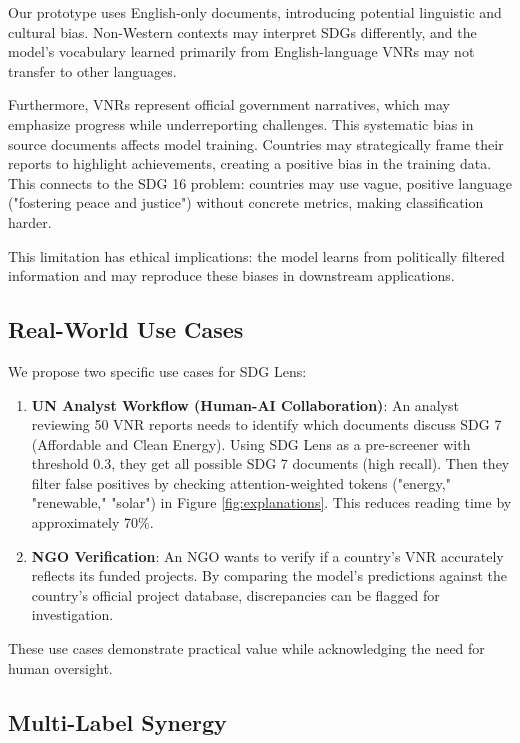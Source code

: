 \documentclass[12pt,a4paper]{article}
\begin{document}
Our prototype uses English-only documents, introducing potential linguistic and cultural bias. Non-Western contexts may interpret SDGs differently, and the model's vocabulary learned primarily from English-language VNRs may not transfer to other languages.

Furthermore, VNRs represent official government narratives, which may emphasize progress while underreporting challenges. This systematic bias in source documents affects model training. Countries may strategically frame their reports to highlight achievements, creating a positive bias in the training data. This connects to the SDG 16 problem: countries may use vague, positive language ("fostering peace and justice") without concrete metrics, making classification harder.

This limitation has ethical implications: the model learns from politically filtered information and may reproduce these biases in downstream applications.

\subsection{Real-World Use Cases}

We propose two specific use cases for SDG Lens:

\begin{enumerate}
    \item \textbf{UN Analyst Workflow (Human-AI Collaboration)}: An analyst reviewing 50 VNR reports needs to identify which documents discuss SDG 7 (Affordable and Clean Energy). Using SDG Lens as a pre-screener with threshold 0.3, they get all possible SDG 7 documents (high recall). Then they filter false positives by checking attention-weighted tokens ("energy," "renewable," "solar") in Figure \ref{fig:explanations}. This reduces reading time by approximately 70\%.
    \item \textbf{NGO Verification}: An NGO wants to verify if a country's VNR accurately reflects its funded projects. By comparing the model's predictions against the country's official project database, discrepancies can be flagged for investigation.
\end{enumerate}

These use cases demonstrate practical value while acknowledging the need for human oversight.

\subsection{Multi-Label Synergy}
\end{document}
